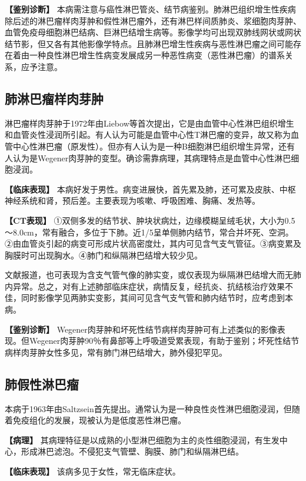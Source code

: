 \textbf{【鉴别诊断】}
本病需注意与癌性淋巴管炎、结节病鉴别。肺淋巴组织增生性疾病除后述的淋巴瘤样肉芽肿和假性淋巴瘤外，还有淋巴样间质肺炎、浆细胞肉芽肿、血管免疫母细胞淋巴结病、巨淋巴结增生病等。影像学均可出现双肺线网状或网状结节影，但又各有其他影像学特点。且肺淋巴增生性疾病与恶性淋巴瘤之间可能存在着由一种良性淋巴增生性病变发展成另一种恶性病变（恶性淋巴瘤）的谱系关系，应予注意。

\subsection{肺淋巴瘤样肉芽肿}

淋巴瘤样肉芽肿于1972年由Liebow等首次提出，它是由血管中心性淋巴组织增生和血管炎性浸润所引起。有人认为可能是血管中心性T淋巴瘤的变异，故又称为血管中心性淋巴瘤（原发性）。但亦有人认为是一种B细胞淋巴组织增生异常，还有人认为是Wegener肉芽肿的变型。确诊需靠病理，其病理特点是血管中心性淋巴细胞浸润。

\textbf{【临床表现】}
本病好发于男性。病变进展快，首先累及肺，还可累及皮肤、中枢神经系统和肾，预后差。主要表现为咳嗽、呼吸困难、胸痛、发热等。

\textbf{【CT表现】}
①双侧多发的结节状、肿块状病灶，边缘模糊呈绒毛状，大小为0.5～8.0cm，常有融合，多位于下肺。近1/5呈单侧肺内结节，常合并坏死、空洞。②由血管炎引起的病变可形成片状高密度灶，其内可见含气支气管征。③病变累及胸膜时可出现胸水。④肺门和纵隔淋巴结增大较少见。

文献报道，也可表现为含支气管气像的肺实变，或仅表现为纵隔淋巴结增大而无肺内异常。总之，对有上述肺部临床症状，病情反复，经抗炎、抗结核治疗效果不佳，同时影像学见两肺实变影，其间可见含气支气管和肺内结节时，应考虑到本病。

\textbf{【鉴别诊断】}
Wegener肉芽肿和坏死性结节病样肉芽肿可有上述类似的影像表现。但Wegener肉芽肿90％有鼻部等上呼吸道受累表现，有助于鉴别；坏死性结节病样肉芽肿女性多见，常有肺门淋巴结增大，肺外侵犯罕见。

\subsection{肺假性淋巴瘤}

本病于1963年由Saltzsein首先提出。通常认为是一种良性炎性淋巴细胞浸润，但随着免疫组化的发展，现被认为是低度恶性淋巴瘤。

\textbf{【病理】}
其病理特征是以成熟的小型淋巴细胞为主的炎性细胞浸润，有生发中心，形成淋巴滤泡。不侵犯支气管壁、胸膜、肺门和纵隔淋巴结。

\textbf{【临床表现】} 该病多见于女性，常无临床症状。

